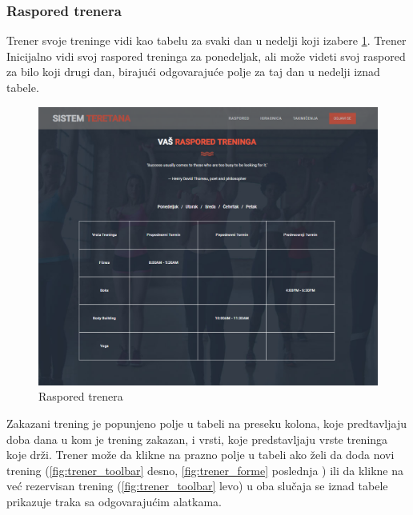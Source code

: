 \documentclass[../main.tex]{subfiles}
\begin{document}
\subsubsection{Raspored trenera}
Trener svoje treninge vidi kao tabelu za svaki dan u nedelji koji izabere \ref{fig:trener_raspored}. Trener Inicijalno vidi svoj raspored treninga za ponedeljak, ali može videti svoj raspored za bilo koji drugi dan, birajući odgovarajuće polje za taj dan u nedelji iznad tabele.

\begin{figure}[!ht]
\begin{center}
\includegraphics[scale=0.35]{sections/korisnicki_interfejs/screenshots/trener_raspored_init.PNG}
\end{center}
\caption{Raspored trenera}
\label{fig:trener_raspored}
\end{figure}


Zakazani trening je popunjeno polje u tabeli na preseku kolona, koje predtavljaju doba dana u kom je trening zakazan, i vrsti, koje predstavljaju vrste treninga koje drži. Trener može da klikne na prazno polje u tabeli ako želi da doda novi trening (\ref{fig:trener_toolbar} desno, \ref{fig:trener_forme} poslednja ) ili da klikne na već rezervisan trening (\ref{fig:trener_toolbar} levo) u oba slučaja se iznad tabele prikazuje traka sa odgovarajućim alatkama. 
\end{document}

